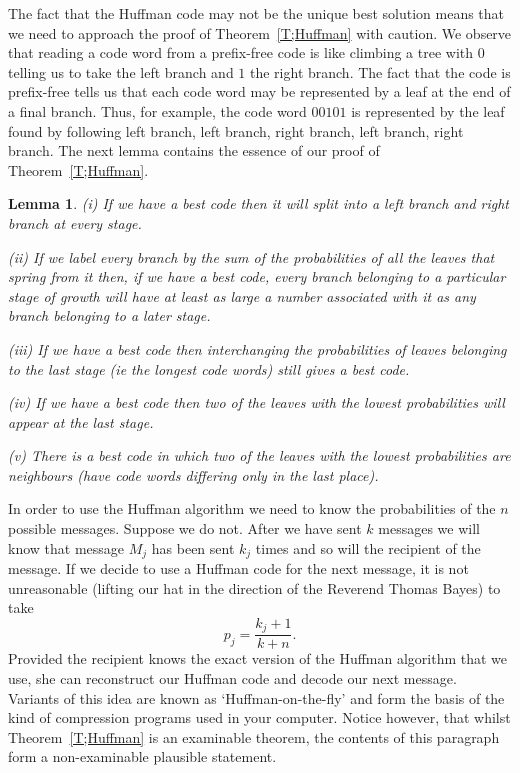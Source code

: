 \documentclass[12pt,a4paper]{article}
\theoremstyle{plain}
\newtheorem{lemma}[theorem]{Lemma}
\theoremstyle{definition}
\begin{document}
    The fact that the Huffman code may not be the unique
    best solution means that we need to approach the proof of
    Theorem~\ref{T;Huffman} with caution. We observe that
    reading a code word from a prefix-free
    code is like climbing a tree
    with $0$ telling us to take the left branch and
    $1$ the right branch. The fact that the code is prefix-free
    tells us that each code word
    may be represented by a leaf at the end of
    a final branch.
    Thus, for example,
    the code word $00101$ is represented by
    the leaf found by following left branch, left branch,
    right branch, left branch, right branch.
    The next lemma contains the essence of our proof
    of Theorem~\ref{T;Huffman}.
    \begin{lemma}
        \label{L;pre Huffman}
        (i) If we have a best code then it will split into
        a left branch and right branch at every stage.

        (ii) If we label every branch by the sum of the probabilities
        of all the leaves that spring from it then, if we have a best code,
        every branch belonging to a particular stage of growth will have at
        least as large a number associated with it
        as any branch belonging to a later stage.

        (iii) If we have a best code then interchanging the
        probabilities of leaves belonging to the last stage
        (ie the longest code words) still gives a best code.

        (iv)  If we have a best code then two of the
        leaves with the lowest probabilities will appear at the last stage.

        (v) There is a best code in which two of the
        leaves with the lowest probabilities are neighbours
        (have code words differing only in the last place).
    \end{lemma}

    In order to use the Huffman algorithm we need to
    know the probabilities of the $n$ possible messages.
    Suppose we do not. After we have sent $k$ messages
    we will know that message $M_{j}$ has been sent
    $k_{j}$ times and so will the recipient of the message.
    If we decide to use a Huffman code for the next message,
    it is not unreasonable (lifting our hat
    in the direction of the Reverend Thomas Bayes) to take
    \[p_{j}=\frac{k_{j}+1}{k+n}.\]
    Provided the recipient knows the exact version of
    the Huffman algorithm that we use, she can
    reconstruct our Huffman code and decode our next message.
    Variants of this idea are known as `Huffman-on-the-fly'
    and form the basis of the kind of compression programs
    used in your computer. Notice however, that whilst
    Theorem~\ref{T;Huffman} is an examinable theorem,
    the contents of this paragraph form a non-examinable
    plausible statement.
\end{document}

